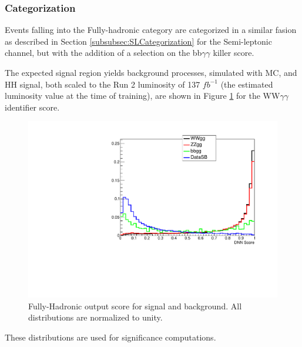 \subsubsection{Categorization}
\label{subsubsec:Categorization}

Events falling into the Fully-hadronic category are categorized in a similar fasion as described in Section \ref{subsubsec:SLCategorization} for the Semi-leptonic channel, but with the addition of a selection on the bb$\gamma\gamma$ killer score. 


The expected signal region yields background processes, simulated with MC, and HH signal, both scaled to the Run 2 luminosity of 137 $fb^{-1}$ (the estimated luminosity value at the time of training), are shown in Figure \ref{fig:FH_DnnScore}
for the WW$\gamma\gamma$ identifier score.

\begin{figure}[!htbp]
  \centering
  \includegraphics[scale=0.6]{Sections/HHWWgg/images/FH_DNN/WWvsAll_2017_NormUnity_BBggScoreCut0p6.pdf}
  \caption{Fully-Hadronic output score for signal and background. All distributions are normalized to unity.}
  \label{fig:FH_DnnScore}
\end{figure}

These distributions are used for significance computations. 

